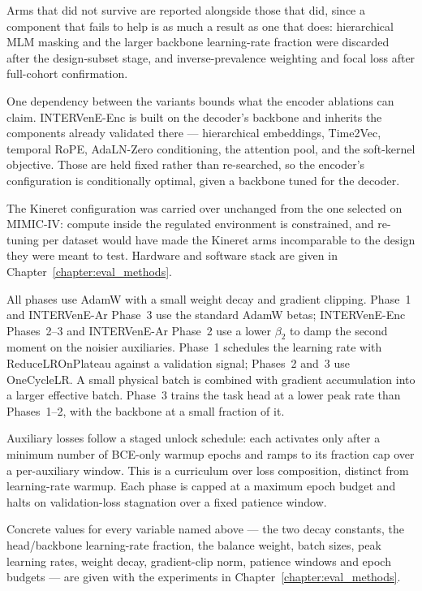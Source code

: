 Arms that did not survive are reported alongside those that did, since a component that fails to help is as much a result as one that does: hierarchical MLM masking and the larger backbone learning-rate fraction were discarded after the design-subset stage, and inverse-prevalence weighting and focal loss after full-cohort confirmation.

One dependency between the variants bounds what the encoder ablations can claim. INTERVenE-Enc is built on the decoder's backbone and inherits the components already validated there --- hierarchical embeddings, Time2Vec, temporal RoPE, AdaLN-Zero conditioning, the attention pool, and the soft-kernel objective. Those are held fixed rather than re-searched, so the encoder's configuration is conditionally optimal, given a backbone tuned for the decoder.

The Kineret configuration was carried over unchanged from the one selected on MIMIC-IV: compute inside the regulated environment is constrained, and re-tuning per dataset would have made the Kineret arms incomparable to the design they were meant to test. Hardware and software stack are given in Chapter~\ref{chapter:eval_methods}.

All phases use AdamW with a small weight decay and gradient clipping. Phase~1 and INTERVenE-Ar Phase~3 use the standard AdamW betas; INTERVenE-Enc Phases~2--3 and INTERVenE-Ar Phase~2 use a lower $\beta_2$ to damp the second moment on the noisier auxiliaries. Phase~1 schedules the learning rate with ReduceLROnPlateau against a validation signal; Phases~2 and~3 use OneCycleLR. A small physical batch is combined with gradient accumulation into a larger effective batch. Phase~3 trains the task head at a lower peak rate than Phases~1--2, with the backbone at a small fraction of it.

Auxiliary losses follow a staged unlock schedule: each activates only after a minimum number of BCE-only warmup epochs and ramps to its fraction cap over a per-auxiliary window. This is a curriculum over loss composition, distinct from learning-rate warmup. Each phase is capped at a maximum epoch budget and halts on validation-loss stagnation over a fixed patience window.

Concrete values for every variable named above --- the two decay constants, the head/backbone learning-rate fraction, the balance weight, batch sizes, peak learning rates, weight decay, gradient-clip norm, patience windows and epoch budgets --- are given with the experiments in Chapter~\ref{chapter:eval_methods}.
